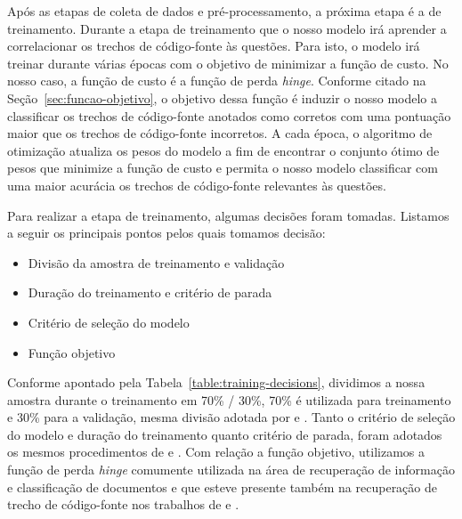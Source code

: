 Após as etapas de coleta de dados e pré-processamento, a próxima etapa é a de treinamento. Durante a etapa de treinamento que o nosso modelo irá aprender a correlacionar os trechos de código-fonte às questões. Para isto, o modelo irá treinar durante várias épocas com o objetivo de minimizar a função de custo. No nosso caso, a função de custo é a função de perda \textit{hinge}. Conforme citado na Seção~\ref{sec:funcao-objetivo}, o objetivo dessa função é induzir o nosso modelo a classificar os trechos de código-fonte anotados como corretos com uma pontuação maior que os trechos de código-fonte incorretos. A cada época, o algoritmo de otimização atualiza os pesos do modelo a fim de encontrar o conjunto ótimo de pesos que minimize a função de custo e permita o nosso modelo classificar com uma maior acurácia os trechos de código-fonte relevantes às questões.

Para realizar a etapa de treinamento, algumas decisões foram tomadas. Listamos a seguir os principais pontos pelos quais tomamos decisão:

\begin{itemize}
    \item Divisão da amostra de treinamento e validação
    \item Duração do treinamento e critério de parada
    \item Critério de seleção do modelo
    \item Função objetivo
\end{itemize}

Conforme apontado pela Tabela~\ref{table:training-decisions}, dividimos a nossa amostra durante o treinamento em 70\% / 30\%, 70\% é utilizada para treinamento e 30\% para a validação, mesma divisão adotada por \cite{yao-2018} e \cite{cambronero-deep-learning-code-search:2019}. Tanto o critério de seleção do modelo e duração do treinamento quanto critério de parada, foram adotados os mesmos procedimentos de \cite{iyer-etal-2016-summarizing} e \cite{yao-2018}. Com relação a função objetivo, utilizamos a função de perda \textit{hinge} comumente utilizada na área de recuperação de informação e classificação de documentos e que esteve presente também na recuperação de trecho de código-fonte nos trabalhos de \cite{Gu-deep-code-search:2018} e \cite{cambronero-deep-learning-code-search:2019}.


